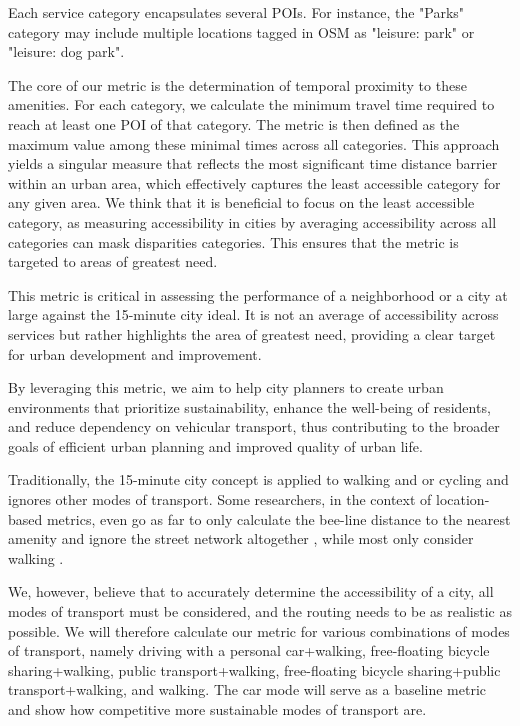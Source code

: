 Each service category encapsulates several POIs. 
For instance, the "Parks" category may include multiple locations tagged in OSM as "leisure: park" or "leisure: dog park".

The core of our metric is the determination of temporal proximity to these amenities. 
For each category, we calculate the minimum travel time required to reach at least one POI of that category. 
The metric is then defined as the maximum value among these minimal times across all categories. 
This approach yields a singular measure that reflects the most significant time distance barrier within an urban area, which effectively captures the least accessible category for any given area.
We think that it is beneficial to focus on the least accessible category, as measuring accessibility in cities by averaging accessibility across all categories can mask disparities categories. 
This ensures that the metric is targeted to areas of greatest need. 

This metric is critical in assessing the performance of a neighborhood or a city at large against the 15-minute city ideal. It is not an average of accessibility across services but rather highlights the area of greatest need, providing a clear target for urban development and improvement.

By leveraging this metric, we aim to help city planners to create urban environments that prioritize sustainability, enhance the well-being of residents, and reduce dependency on vehicular transport, thus contributing to the broader goals of efficient urban planning and improved quality of urban life.

Traditionally, the 15-minute city concept is applied to walking and or cycling and ignores other modes of transport.
Some researchers, in the context of location-based metrics, even go as far to only calculate the bee-line distance to the nearest amenity and ignore the street network altogether \cite{gastnerOptimalDesignSpatial2006}, while most only consider walking \cite{olivariAreItalianCities2023, nicolettiDisadvantagedCommunitiesHave2023}.

We, however, believe that to accurately determine the accessibility of a city, all modes of transport must be considered, and the routing needs to be as realistic as possible.
We will therefore calculate our metric for various combinations of modes of transport, namely driving with a personal car+walking, free-floating bicycle sharing+walking, public transport+walking, free-floating bicycle sharing+public transport+walking, and walking.
The car mode will serve as a baseline metric and show how competitive more sustainable modes of transport are.

